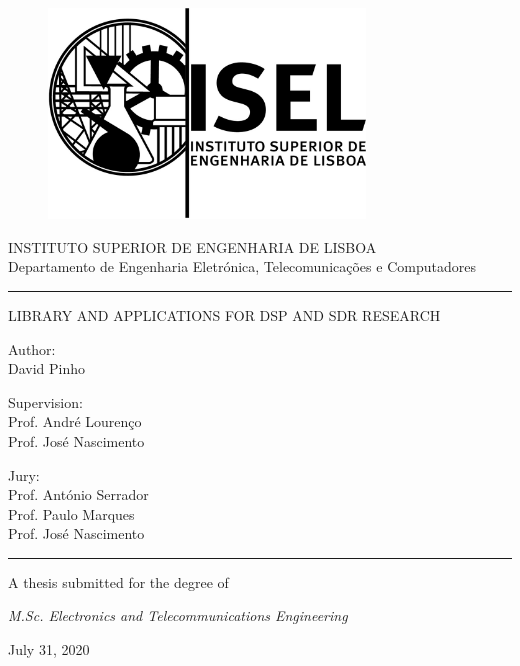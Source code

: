 \documentclass[11pt]{report}
\begin{document}
\begin{titlepage}
\begin{figure}[ht]
  \centering
  \includegraphics[width=0.75\textwidth]{logo_isel}
  \label{fig:logo_isel}
\end{figure}
\begin{center}
  \vspace*{1cm}
  \LARGE
  INSTITUTO SUPERIOR DE ENGENHARIA DE LISBOA\\
  \Large
  Departamento de Engenharia Eletrónica, Telecomunicações e Computadores
  \par\noindent\rule{0.5\textwidth}{1pt}\par

  \vspace{1cm}
  \LARGE
  LIBRARY AND APPLICATIONS FOR DSP AND SDR RESEARCH

  \vspace{0.75cm}
  \normalsize
  Author:\\
  David Pinho

  \vspace{0.5cm}
  Supervision:\\
  Prof. André Lourenço\\
  Prof. José Nascimento

  \vspace{1.0cm}
  Jury:\\
  Prof. António Serrador\\
  Prof. Paulo Marques\\
  Prof. José Nascimento
  \vfill
  \par\noindent\rule{0.5\textwidth}{1pt}\par
  A thesis submitted for the degree of

  \emph{M.Sc. Electronics and Telecommunications Engineering}

  July 31, 2020

\end{center}
\end{titlepage}
\end{document}
